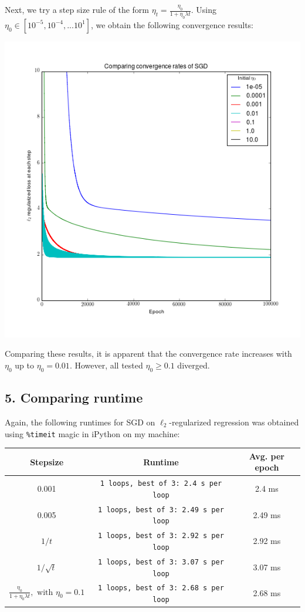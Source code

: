 \documentclass[paper=a4, fontsize=11pt]{scrartcl} %
\numberwithin{equation}{section} %
\numberwithin{figure}{section} %
\numberwithin{table}{section} %
\begin{document}
Next, we try a step size rule of the form $\eta_t = \frac{\eta_0}{1 + \eta_0 \lambda t}$. Using $\eta_0 \in [10^{-5}, 10^{-4}, ... 10^{1}]$, we obtain the following convergence results:

\includegraphics[scale=.8]{./../figures/2_6_4.png}

Comparing these results, it is apparent that the convergence rate increases with $\eta_0$ up to $\eta_0 = 0.01$. However, all tested $\eta_0 \geq 0.1$ diverged.

\subsection*{5. Comparing runtime}

Again, the following runtimes for SGD on $\ell_2$-regularized regression was obtained using \texttt{\%timeit} magic in iPython on my machine:
\begin{center}
\begin{tabular}{|c | c | c |}
\hline
Stepsize & Runtime & Avg. per epoch \\
\hline
0.001 & \texttt{1 loops, best of 3: 2.4 s per loop} & 2.4 ms \\ 
\hline
0.005 & \texttt{1 loops, best of 3: 2.49 s per loop} & 2.49 ms\\
\hline
$1/t$ & \texttt{1 loops, best of 3: 2.92 s per loop} & 2.92 ms \\
\hline
$1/\sqrt{t}$ & \texttt{1 loops, best of 3: 3.07 s per loop} & 3.07 ms \\
\hline
$\frac{\eta_0}{1 + \eta_0 \lambda t}, \textrm{ with } \eta_0 = 0.1$ & \texttt{1 loops, best of 3: 2.68 s per loop} & 2.68 ms \\
\hline
\end{tabular} \\
\end{center}
\end{document}
